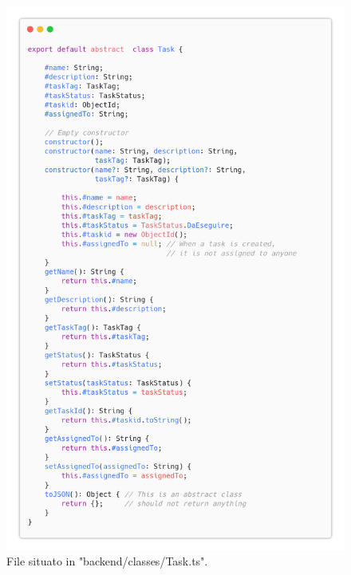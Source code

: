 \documentclass{report}
\begin{document}
\begin{figure}[H]
	\centering\includegraphics[width=1\textwidth]{images/code_task.png}
	File situato in "backend/classes/Task.ts".
\end{figure}
\end{document}
